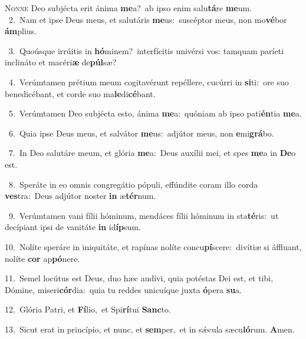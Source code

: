 \lettrine{\initial\textcolor{\initialcolor}{N}}{onne} Deo subjécta erit ánima \textbf{me}\-a?~\star ab ipso enim salu\-\textbf{tá}\-re \textbf{me}\-um.\\
{\numbfont\textcolor{\numbcolor}{~2.}}~Nam et ipse Deus meus, et salutáris \textbf{me}\-us:~\star suscéptor meus, non mo\-\textbf{vé}\-bor \textbf{ám}\-plius.\par
{\numbfont\textcolor{\numbcolor}{~3.}}~Quoúsque irrúitis in \textbf{hó}\-minem?~\star interfícitis univérsi vos: tamquam paríeti inclináto et macéri\textbf{æ} de\-\textbf{púl}\-sæ?\par
{\numbfont\textcolor{\numbcolor}{~4.}}~Verúmtamen prétium meum cogitavérunt repéllere, cucúrri in \textbf{si}\-ti:~\star ore suo benedicébant, et corde suo ma\-\textbf{le}\-di\-\textbf{cé}\-bant.\par
{\numbfont\textcolor{\numbcolor}{~5.}}~Verúmtamen Deo subjécta esto, ánima \textbf{me}\-a:~\star quóniam ab ipso pati\-\textbf{én}\-tia \textbf{me}\-a.\par
{\numbfont\textcolor{\numbcolor}{~6.}}~Quia ipse Deus meus, et salvátor \textbf{me}\-us:~\star adjútor meus, non \textbf{e}\-mi\-\textbf{grá}\-bo.\par
{\numbfont\textcolor{\numbcolor}{~7.}}~In Deo salutáre meum, et glória \textbf{me}\-a:~\star Deus auxílii mei, et spes \textbf{me}\-a in \textbf{De}\-o est.\par
{\numbfont\textcolor{\numbcolor}{~8.}}~Speráte in eo omnis congregátio pópuli, effúndite coram illo corda \textbf{ves}\-tra:~\star Deus adjútor noster \textbf{in} æ\-\textbf{tér}\-num.\par
{\numbfont\textcolor{\numbcolor}{~9.}}~Verúmtamen vani fílii hóminum, mendáces fílii hóminum in sta\-\textbf{té}\-ris:~\star ut decípiant ipsi de vanitáte \textbf{in} id\-\textbf{íp}\-sum.\par
{\numbfont\textcolor{\numbcolor}{10.}}~Nolíte speráre in iniquitáte, et rapínas nolíte concu\-\textbf{pí}\-scere:~\star divítiæ si áffluant, nolíte \textbf{cor} ap\-\textbf{pó}\-nere.\par
{\numbfont\textcolor{\numbcolor}{11.}}~Semel locútus est Deus, duo hæc audívi, quia potéstas Dei est, et tibi, Dómine, miseri\-\textbf{cór}\-dia:~\star quia tu reddes unicuíque juxta \textbf{ó}\-pera \textbf{su}\-a.\par
{\numbfont\textcolor{\numbcolor}{12.}}~Glória Patri, et \textbf{Fí}\-lio,~\star et Spi\-\textbf{rí}\-tui \textbf{Sanc}\-to.\par
{\numbfont\textcolor{\numbcolor}{13.}}~Sicut erat in princípio, et nunc, et \textbf{sem}\-per,~\star et in sǽcula sæcu\-\textbf{ló}\-rum. \textbf{A}\-men.\par
